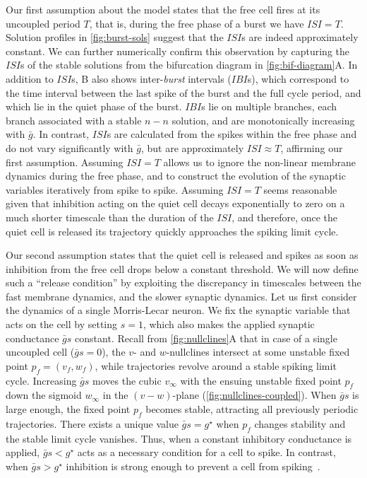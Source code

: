 \documentclass[utf8]{frontiersFPHY} %
\newcommand{\gbar}{\bar g}
\begin{document}
Our first assumption about the model states that the free cell fires at its uncoupled period $T$, that is, during the free phase of a burst we have $ISI=T$.
Solution profiles in \cref{fig:burst-sols} suggest that the $ISI$s are indeed approximately constant.
We can further numerically confirm this observation by capturing the $ISI$s of the stable solutions from the bifurcation diagram in \cref{fig:bif-diagram}A.
In addition to $ISI$s, B also shows inter-\textit{burst} intervals ($IBI$s), which correspond to the time interval between the last spike of the burst and the full cycle period, and which lie in the quiet phase of the burst.
$IBI$s lie on multiple branches, each branch associated with a stable $n-n$ solution, and are monotonically increasing with $\gbar$.
In contrast, $ISI$s are calculated from the spikes within the free phase and do not vary significantly with $\gbar$, but are approximately $ISI\approx T$, affirming our first assumption.
Assuming $ISI=T$ allows us to ignore the non-linear membrane dynamics during the free phase, and to construct the evolution of the synaptic variables iteratively from spike to spike.
Assuming $ISI=T$ seems reasonable given that inhibition acting on the quiet cell decays exponentially to zero on a much shorter timescale than the duration of the $ISI$, and therefore, once the quiet cell is released its trajectory quickly approaches the spiking limit cycle.

Our second assumption states that the quiet cell is released and spikes as soon as inhibition from the free cell drops below a constant threshold.
We will now define such a ``release condition'' by exploiting the discrepancy in timescales between the fast membrane dynamics, and the slower synaptic dynamics.
Let us first consider the dynamics of a single Morris-Lecar neuron.
We fix the synaptic variable that acts on the cell by setting $s=1$, which also makes the applied synaptic conductance $\gbar s$ constant.
Recall from \cref{fig:nullclines}A that in case of a single uncoupled cell ($\gbar s=0$), the $v$- and $w$-nullclines intersect at some unstable fixed point $p_{f}=(v_{f},w_{f})$, while trajectories revolve around a stable spiking limit cycle.
Increasing $\gbar s$ moves the cubic $v_{\infty}$ with the ensuing unstable fixed point $p_{f}$ down the sigmoid $w_{\infty}$ in the $(v-w)$-plane (\cref{fig:nullclines-coupled}).
When $\gbar s$ is large enough, the fixed point $p_{f}$ becomes stable, attracting all previously periodic trajectories.
There exists a unique value $\gbar s=g^{\star}$ when $p_{f}$ changes stability and the stable limit cycle vanishes.
Thus, when a constant inhibitory conductance is applied, $\gbar s<g^{\star}$ acts as a necessary condition for a cell to spike.
In contrast, when $\gbar s>g^{\star}$ inhibition is strong enough to prevent a cell from spiking~\citep{bose2011}.
\end{document}
